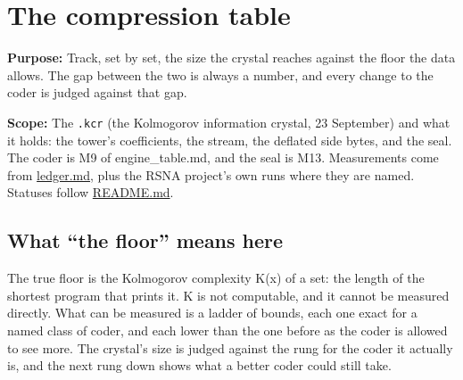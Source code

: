 \chapter{\texorpdfstring{The compression table}{The compression table}}
\label{chap:compression-table}

\textbf{Purpose:} Track, set by set, the size the crystal reaches against the floor the data allows. The gap between the two is always a number, and every change to the coder is judged against that gap.

\textbf{Scope:} The \texttt{.\allowbreak{}kcr} (the Kolmogorov information crystal, 23 September) and what it holds: the tower's coefficients, the stream, the deflated side bytes, and the seal. The coder is M9 of engine\_\allowbreak{}table.md, and the seal is M13. Measurements come from \hyperref[chap:ledger]{ledger.md}, plus the RSNA project's own runs where they are named. Statuses follow \hyperref[chap:readme]{README.md}.

\section{\texorpdfstring{What “the floor” means here}{What "the floor" means here}}

The true floor is the Kolmogorov complexity K(x) of a set: the length of the shortest program that prints it. K is not computable, and it cannot be measured directly. What can be measured is a ladder of bounds, each one exact for a named class of coder, and each lower than the one before as the coder is allowed to see more. The crystal's size is judged against the rung for the coder it actually is, and the next rung down shows what a better coder could still take.

